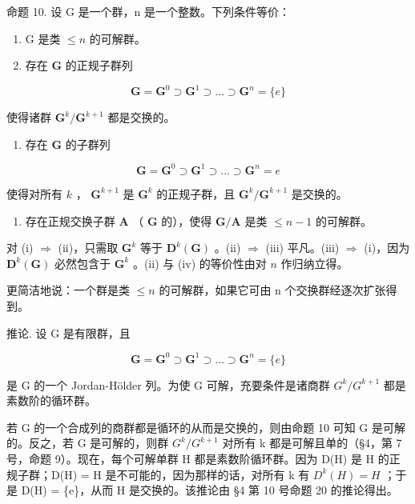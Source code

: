 命题 10. 设 G 是一个群，n 是一个整数。下列条件等价：

\begin{enumerate}
\def\labelenumi{(\roman{enumi})}
\item
  G 是类 \(\leqslant n\) 的可解群。
\item
  存在 \(\mathbf{G}\) 的正规子群列
\end{enumerate}

\[
\mathbf {G} = \mathbf {G} ^ {0} \supset \mathbf {G} ^ {1} \supset \dots \supset \mathbf {G} ^ {n} = \{e \}
\]

使得诸群 \(\mathbf{G}^k /\mathbf{G}^{k + 1}\) 都是交换的。

\begin{enumerate}
\def\labelenumi{(\roman{enumi})}
\setcounter{enumi}{2}
\tightlist
\item
  存在 \(\mathbf{G}\) 的子群列
\end{enumerate}

\[
\mathbf {G} = \mathbf {G} ^ {0} \supset \mathbf {G} ^ {1} \supset \dots \supset \mathbf {G} ^ {n} = e
\]

使得对所有 \(k\) ， \(\mathbf{G}^{k+1}\) 是 \(\mathbf{G}^k\) 的正规子群，且 \(\mathbf{G}^k/\mathbf{G}^{k+1}\) 是交换的。

\begin{enumerate}
\def\labelenumi{(\roman{enumi})}
\setcounter{enumi}{3}
\tightlist
\item
  存在正规交换子群 \(\mathbf{A}\) （ \(\mathbf{G}\) 的），使得 \(\mathbf{G} / \mathbf{A}\) 是类 \(\leqslant n - 1\) 的可解群。
\end{enumerate}

对 (i) \(\Rightarrow\) (ii)，只需取 \(\mathbf{G}^k\) 等于 \(\mathbf{D}^k (\mathbf{G})\) 。(ii) \(\Rightarrow\) (iii) 平凡。(iii) \(\Rightarrow\) (i)，因为 \(\mathbf{D}^k (\mathbf{G})\) 必然包含于 \(\mathbf{G}^k\) 。(ii) 与 (iv) 的等价性由对 \(n\) 作归纳立得。

更简洁地说：一个群是类 \(\leqslant n\) 的可解群，如果它可由 n 个交换群经逐次扩张得到。

推论. 设 G 是有限群，且

\[
\mathbf {G} = \mathbf {G} ^ {0} \supset \mathbf {G} ^ {1} \supset \dots \supset \mathbf {G} ^ {n} = \{e \}
\]

是 G 的一个 Jordan-Hölder 列。为使 G 可解，充要条件是诸商群 \(G^{k}/G^{k+1}\) 都是素数阶的循环群。

若 G 的一个合成列的商群都是循环的从而是交换的，则由命题 10 可知 G 是可解的。反之，若 G 是可解的，则群 \(G^{k}/G^{k+1}\) 对所有 k 都是可解且单的（§4，第 7 号，命题 9）。现在，每个可解单群 H 都是素数阶循环群。因为 D(H) 是 H 的正规子群；D(H) = H 是不可能的，因为那样的话，对所有 k 有 \(D^{k}(H) = H\) ；于是 D(H) = \{e\}，从而 H 是交换的。该推论由 §4 第 10 号命题 20 的推论得出。

